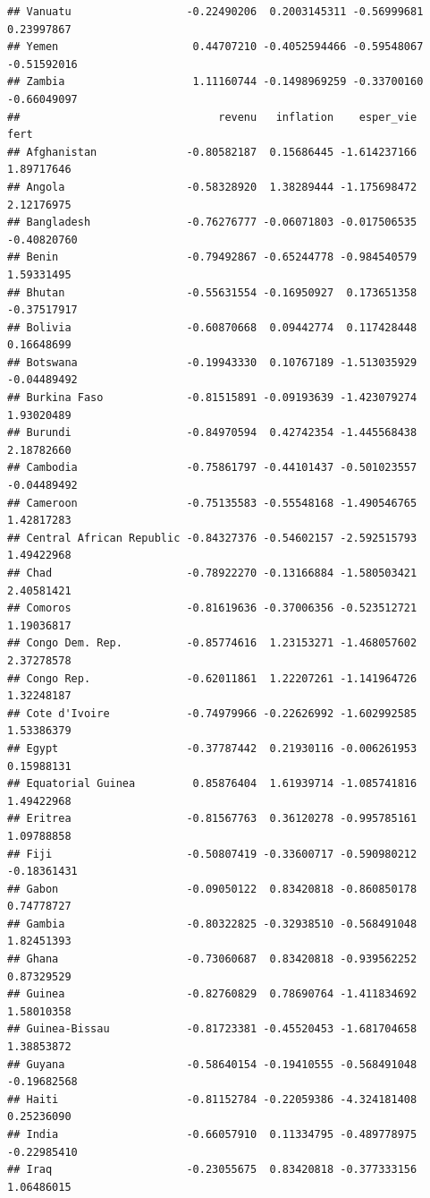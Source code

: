 \documentclass[
]{article}
\begin{document}
\begin{verbatim}
## Vanuatu                  -0.22490206  0.2003145311 -0.56999681  0.23997867
## Yemen                     0.44707210 -0.4052594466 -0.59548067 -0.51592016
## Zambia                    1.11160744 -0.1498969259 -0.33700160 -0.66049097
##                               revenu   inflation    esper_vie        fert
## Afghanistan              -0.80582187  0.15686445 -1.614237166  1.89717646
## Angola                   -0.58328920  1.38289444 -1.175698472  2.12176975
## Bangladesh               -0.76276777 -0.06071803 -0.017506535 -0.40820760
## Benin                    -0.79492867 -0.65244778 -0.984540579  1.59331495
## Bhutan                   -0.55631554 -0.16950927  0.173651358 -0.37517917
## Bolivia                  -0.60870668  0.09442774  0.117428448  0.16648699
## Botswana                 -0.19943330  0.10767189 -1.513035929 -0.04489492
## Burkina Faso             -0.81515891 -0.09193639 -1.423079274  1.93020489
## Burundi                  -0.84970594  0.42742354 -1.445568438  2.18782660
## Cambodia                 -0.75861797 -0.44101437 -0.501023557 -0.04489492
## Cameroon                 -0.75135583 -0.55548168 -1.490546765  1.42817283
## Central African Republic -0.84327376 -0.54602157 -2.592515793  1.49422968
## Chad                     -0.78922270 -0.13166884 -1.580503421  2.40581421
## Comoros                  -0.81619636 -0.37006356 -0.523512721  1.19036817
## Congo Dem. Rep.          -0.85774616  1.23153271 -1.468057602  2.37278578
## Congo Rep.               -0.62011861  1.22207261 -1.141964726  1.32248187
## Cote d'Ivoire            -0.74979966 -0.22626992 -1.602992585  1.53386379
## Egypt                    -0.37787442  0.21930116 -0.006261953  0.15988131
## Equatorial Guinea         0.85876404  1.61939714 -1.085741816  1.49422968
## Eritrea                  -0.81567763  0.36120278 -0.995785161  1.09788858
## Fiji                     -0.50807419 -0.33600717 -0.590980212 -0.18361431
## Gabon                    -0.09050122  0.83420818 -0.860850178  0.74778727
## Gambia                   -0.80322825 -0.32938510 -0.568491048  1.82451393
## Ghana                    -0.73060687  0.83420818 -0.939562252  0.87329529
## Guinea                   -0.82760829  0.78690764 -1.411834692  1.58010358
## Guinea-Bissau            -0.81723381 -0.45520453 -1.681704658  1.38853872
## Guyana                   -0.58640154 -0.19410555 -0.568491048 -0.19682568
## Haiti                    -0.81152784 -0.22059386 -4.324181408  0.25236090
## India                    -0.66057910  0.11334795 -0.489778975 -0.22985410
## Iraq                     -0.23055675  0.83420818 -0.377333156  1.06486015

\end{verbatim}
\end{document}
